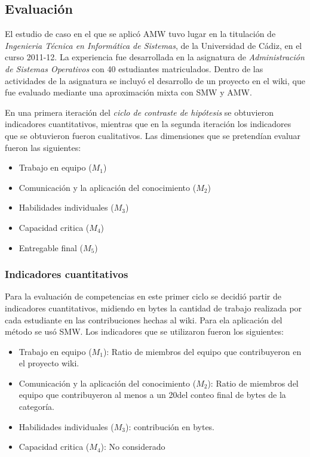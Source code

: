 \subsection{Evaluación}

El estudio de caso en el que se aplicó AMW tuvo lugar en la titulación de \emph{Ingenieria Técnica en Informática de Sistemas},  de la Universidad de Cádiz, en el curso 2011-12. La experiencia fue desarrollada en la asignatura de \emph{Administración de Sistemas Operativos} con 40 estudiantes matriculados. Dentro de las actividades de la asignatura se incluyó el desarrollo de un proyecto en el wiki, que fue evaluado mediante una aproximación mixta con SMW y AMW.

En una primera iteración del \emph{ciclo de contraste de hipótesis} se obtuvieron indicadores cuantitativos, mientras que en la segunda iteración los indicadores que se obtuvieron fueron cualitativos. 
Las dimensiones que se pretendían evaluar fueron las siguientes:

\begin{itemize}
	\item Trabajo en equipo ($M_1$)
	\item Comunicación y la aplicación del conocimiento ($M_2$)
	\item Habilidades individuales ($M_3$)
	\item Capacidad critica ($M_4$)
	\item Entregable final ($M_5$)
\end{itemize}

\subsubsection{Indicadores cuantitativos}

Para la evaluación de competencias en este primer ciclo se decidió partir de indicadores cuantitativos, midiendo en bytes la cantidad de trabajo realizada por cada estudiante en las contribuciones hechas al wiki. Para ela aplicación del método se usó SMW. Los indicadores que se utilizaron fueron los siguientes:

\begin{itemize}
	\item Trabajo en equipo ($M_1$): Ratio de miembros del equipo que contribuyeron en el proyecto wiki.
	\item Comunicación y la aplicación del conocimiento ($M_2$): Ratio de miembros del equipo que contribuyeron al menos a un 20\percentage del conteo final de bytes de la categoría.
	\item Habilidades individuales ($M_3$): contribución en bytes.
	\item Capacidad critica ($M_4$): No considerado
\end{itemize}

